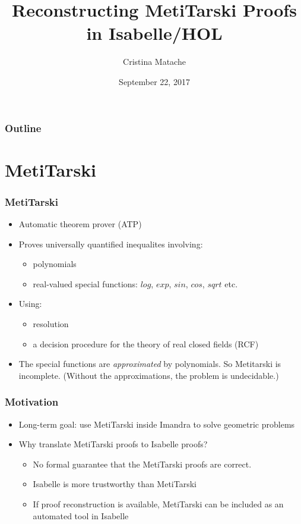\documentclass{beamer}
\title[Reconstructing MetiTarski Proofs in Isabelle]{Reconstructing MetiTarski Proofs in Isabelle/HOL}
\author{Cristina Matache}
\institute[]{\texttt{[image: ai\_logo\_title]}}
\date{September 22, 2017}
\begin{document}
\begin{frame}
\titlepage
\end{frame}

\begin{frame}
\frametitle{Outline}
\tableofcontents
\end{frame}

\section{MetiTarski}

\begin{frame}
\frametitle{MetiTarski}
\begin{itemize}
\item Automatic theorem prover (ATP)
\item Proves universally quantified inequalites involving:
	\begin{itemize}
	\item polynomials
	\item real-valued special functions: $log$, $exp$, $sin$, $cos$, $sqrt$ etc.
	\end{itemize}
\item Using:
	\begin{itemize}
	\item resolution
	\item a decision procedure for the theory of real closed fields (RCF)
	\end{itemize}
\item The special functions are \textit{approximated} by polynomials. So Metitarski is incomplete. (Without the approximations, the problem is undecidable.)			
\end{itemize}
\end{frame}

\begin{frame}
\frametitle{Motivation}

\begin{itemize}
\item Long-term goal: use MetiTarski inside Imandra to solve geometric problems
	
\item Why translate MetiTarski proofs to Isabelle proofs?
\begin{itemize}
\item No formal guarantee that the MetiTarski proofs are correct.
\item Isabelle is more trustworthy than MetiTarski
\item If proof reconstruction is available, MetiTarski can be included as an automated tool in Isabelle
\end{itemize}
\end{itemize}
\end{frame}
\end{document}
